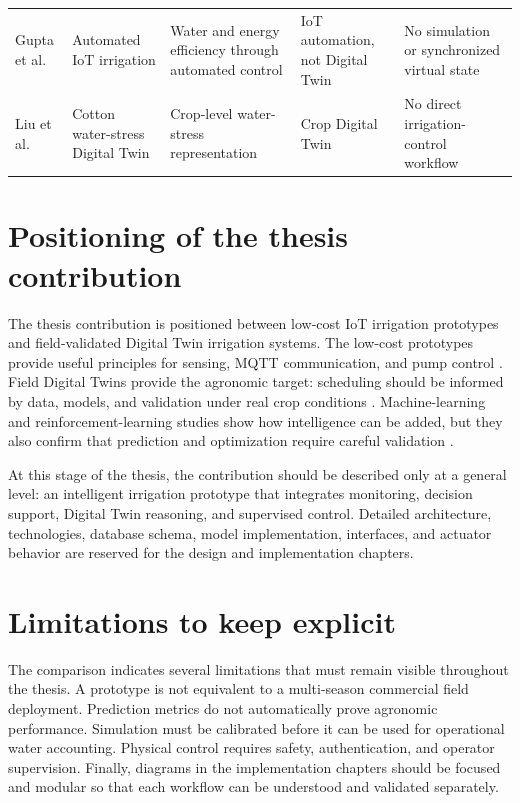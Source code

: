 \begin{footnotesize}
\begin{longtable}{@{}p{}p{}p{}p{}p{}@{}}
Gupta et al. \cite{gupta2025iotirrigation} & Automated IoT irrigation & Water and energy efficiency through automated control & IoT automation, not Digital Twin & No simulation or synchronized virtual state \\
Liu et al. \cite{liu2025cottondt} & Cotton water-stress Digital Twin & Crop-level water-stress representation & Crop Digital Twin & No direct irrigation-control workflow \\
\bottomrule
\end{longtable}
\end{footnotesize}

\section{Positioning of the thesis contribution}

The thesis contribution is positioned between low-cost IoT irrigation prototypes and field-validated Digital Twin irrigation systems. The low-cost prototypes provide useful principles for sensing, MQTT communication, and pump control \cite{kodali2017mqttirrigation}. Field Digital Twins provide the agronomic target: scheduling should be informed by data, models, and validation under real crop conditions \cite{bellvert2023vineyarddt,millan2025tomatodt}. Machine-learning and reinforcement-learning studies show how intelligence can be added, but they also confirm that prediction and optimization require careful validation \cite{tancredi2025irrigationdt,elhachimi2025collectiveirrigationdt,kallenberg2025interoperabledt}.

At this stage of the thesis, the contribution should be described only at a general level: an intelligent irrigation prototype that integrates monitoring, decision support, Digital Twin reasoning, and supervised control. Detailed architecture, technologies, database schema, model implementation, interfaces, and actuator behavior are reserved for the design and implementation chapters.

\section{Limitations to keep explicit}

The comparison indicates several limitations that must remain visible throughout the thesis. A prototype is not equivalent to a multi-season commercial field deployment. Prediction metrics do not automatically prove agronomic performance. Simulation must be calibrated before it can be used for operational water accounting. Physical control requires safety, authentication, and operator supervision. Finally, diagrams in the implementation chapters should be focused and modular so that each workflow can be understood and validated separately.

